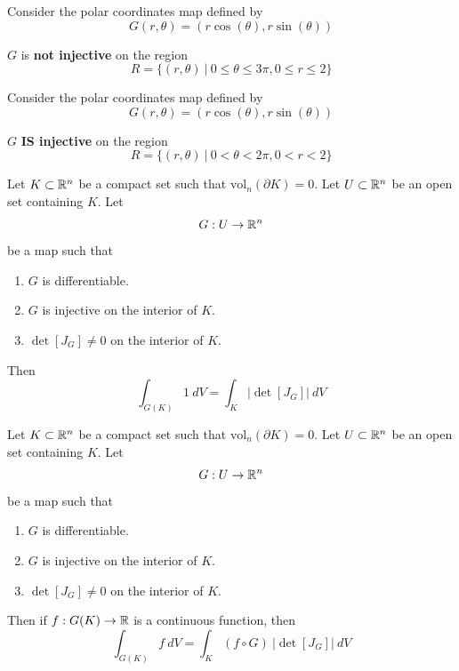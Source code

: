 \begin{example}
     Consider the polar coordinates map defined by $$G(r,\theta) = (r\cos(\theta), r\sin(\theta))$$

    $G$ is \textbf{not injective} on the region 
    $$R = \{ (r, \theta) \ | \ 0 \leq \theta \leq 3\pi, 0 \leq r \leq 2\}$$


    \end{example}

    \begin{example}
     Consider the polar coordinates map defined by $$G(r,\theta) = (r\cos(\theta), r\sin(\theta))$$

    $G$ \textbf{IS injective} on the region 
    $$R = \{ (r, \theta) \ | \ 0 < \theta < 2\pi, 0 < r < 2\}$$

    \end{example}


\begin{theorem}
    Let $K \subset \mathbb{R}^n$ be a compact set such that $\text{vol}_n(\partial K) = 0$.  Let $U \subset \mathbb{R}^n$ be an open set containing $K$. Let $$G : U \to \mathbb{R}^n$$ be a map such that 
    \begin{enumerate}
        \item $G$ is differentiable.
        \item $G$ is injective on the interior of $K$.  
        \item $\det [J_G] \neq 0$ on the interior of $K$.  
    \end{enumerate}
    Then
    $$\int_{G(K)} 1 \  dV = \int_K |\det [J_G]| \ dV$$
    \end{theorem}

\begin{theorem}
    Let $K \subset \mathbb{R}^n$ be a compact set such that $\text{vol}_n(\partial K) = 0$.  Let $U \subset \mathbb{R}^n$ be an open set containing $K$. Let $$G : U \to \mathbb{R}^n$$ be a map such that 
    \begin{enumerate}
        \item $G$ is differentiable.
        \item $G$ is injective on the interior of $K$.  
        \item $\det [J_G] \neq 0$ on the interior of $K$.  
    \end{enumerate}
   
    Then if $f: G(K) \to \mathbb{R}$ is a continuous function, then 
    $$\int_{G(K)} f \  dV = \int_K (f \circ G) \ |\det [J_G]| \ dV$$
    \end{theorem}

